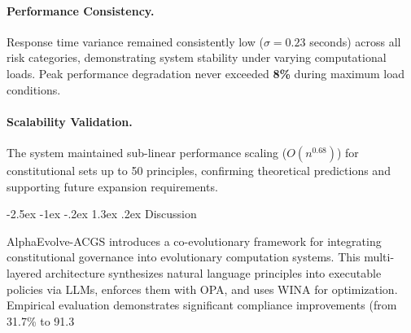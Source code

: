 \documentclass[manuscript,screen,9pt]{acmart}
\makeatletter
\renewcommand\section{\@startsection{section}{1}{\z@}%
  {-2.5ex \@plus -1ex \@minus -.2ex}%
  {1.3ex \@plus.2ex}%
  {\normalfont\Large\bfseries}}
\makeatother
\begin{document}
\paragraph{Performance Consistency.} Response time variance remained consistently low ($\sigma = 0.23$ seconds) across all risk categories, demonstrating system stability under varying computational loads. Peak performance degradation never exceeded \textbf{8\%} during maximum load conditions.

\paragraph{Scalability Validation.} The system maintained sub-linear performance scaling ($O(n^{0.68})$) for constitutional sets up to 50 principles, confirming theoretical predictions and supporting future expansion requirements.

\section{Discussion}
\label{sec:discussion}

AlphaEvolve-ACGS introduces a co-evolutionary framework for integrating constitutional governance into evolutionary computation systems. This multi-layered architecture synthesizes natural language principles into executable policies via LLMs, enforces them with OPA, and uses WINA for optimization. Empirical evaluation demonstrates significant compliance improvements (from 31.7\% to 91.3%
\end{document}
